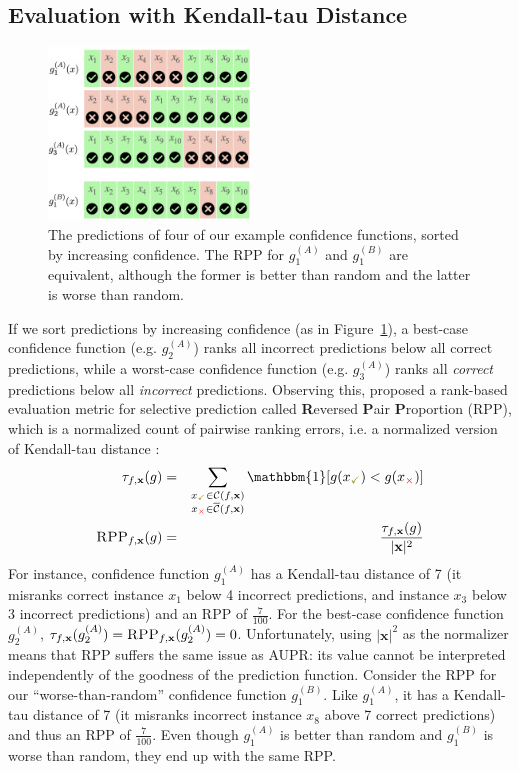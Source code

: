\documentclass[11pt]{article}
\begin{document}
\subsection{Evaluation with Kendall-tau Distance}

\begin{figure}[t]
\centering
\includegraphics[width=0.48\textwidth]{rankedall.png}
\caption{The predictions of four of our example confidence functions, sorted by increasing confidence. The RPP for $g_1^{(A)}$ and $g_1^{(B)}$ are equivalent, although the former is better than random and the latter is worse than random.}
\label{fig:ranked}
\end{figure}


If we sort predictions by increasing confidence (as in Figure~\ref{fig:ranked}), a best-case confidence function (e.g. $g_2^{(A)}$) ranks all incorrect predictions below all correct predictions, while a worst-case confidence function (e.g. $g_3^{(A)}$) ranks all \emph{correct} predictions below all \emph{incorrect} predictions. Observing this, \cite{xin-etal-2021-art} proposed a rank-based evaluation metric for selective prediction called \textbf{R}eversed \textbf{P}air \textbf{P}roportion (RPP), which is a normalized count of pairwise ranking errors, i.e. a normalized version of Kendall-tau distance \cite{kendall1948rank}: 
\begin{eqnarray*}
\tau_{f, \mathbf{x}}(g) &=& \sum_{\substack{
x_{\textcolor{olive}{\checkmark}} \in \mathcal{C}(f, \mathbf{x})\\
x_{\textcolor{red}{\times}} \in \overline{\mathcal{C}}(f, \mathbf{x})}} \mathbbm{1}[g(x_{\textcolor{olive}{\checkmark}}) < g(x_{\textcolor{red}{\times}})] \\
\textsc{RPP}_{f, \mathbf{x}}(g) &=& \frac{\tau_{f, \mathbf{x}}(g)}{|\mathbf{x}|^2}
\end{eqnarray*}
For instance, confidence function $g_1^{(A)}$ has a Kendall-tau distance of 7 (it misranks correct instance $x_1$ below 4 incorrect predictions, and instance $x_3$ below 3 incorrect predictions) and an RPP of $\frac{7}{100}$. For the best-case confidence function $g_2^{(A)}$, $\tau_{f, \mathbf{x}}(g_2^{(A)}) = \textsc{RPP}_{f, \mathbf{x}}(g_2^{(A)}) = 0$. Unfortunately, using $|\mathbf{x}|^2$ as the normalizer means that RPP suffers the same issue as AUPR: its value cannot be interpreted independently of the goodness of the prediction function. Consider the RPP for our ``worse-than-random'' confidence function $g_1^{(B)}$. Like $g_1^{(A)}$, it has a Kendall-tau distance of 7 (it misranks incorrect instance $x_8$ above 7 correct predictions) and thus an RPP of $\frac{7}{100}$. Even though $g_1^{(A)}$ is better than random and $g_1^{(B)}$ is worse than random, they end up with the same RPP. 
\end{document}

